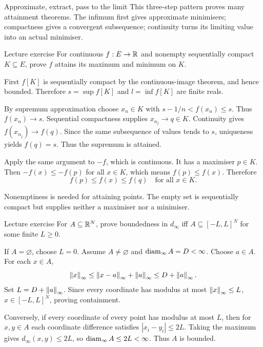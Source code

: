 \begin{method}{Approximate, extract, pass to the limit}
This three-step pattern proves many attainment theorems. The infimum first gives approximate minimisers; compactness gives a convergent subsequence; continuity turns its limiting value into an actual minimiser.
\end{method}
\begin{exam}{Lecture exercise}
For continuous $f:E\to\mathbb R$ and nonempty sequentially compact $K\subseteq E$, prove $f$ attains its maximum and minimum on $K$.
\end{exam}
\begin{answer}
First $f[K]$ is sequentially compact by the continuous-image theorem, and hence bounded. Therefore $s=\sup f[K]$ and $l=\inf f[K]$ are finite reals.

By supremum approximation choose $x_n\in K$ with $s-1/n<f(x_n)\le s$. Thus $f(x_n)\to s$. Sequential compactness supplies $x_{n_j}\to q\in K$. Continuity gives $f(x_{n_j})\to f(q)$. Since the same subsequence of values tends to $s$, uniqueness yields $f(q)=s$. Thus the supremum is attained.

Apply the same argument to $-f$, which is continuous. It has a maximiser $p\in K$. Then $-f(x)\le-f(p)$ for all $x\in K$, which means $f(p)\le f(x)$. Therefore
\[f(p)\le f(x)\le f(q)\quad\text{for all }x\in K.\]
\end{answer}
\begin{tip}
Nonemptiness is needed for attaining points. The empty set is sequentially compact but supplies neither a maximiser nor a minimiser.
\end{tip}
\begin{exam}{Lecture exercise}
For $A\subseteq\mathbb R^N$, prove boundedness in $d_\infty$ iff $A\subseteq[-L,L]^N$ for some finite $L\ge0$.
\end{exam}
\begin{answer}
If $A=\varnothing$, choose $L=0$. Assume $A\ne\varnothing$ and $\operatorname{diam}_\infty A=D<\infty$. Choose $a\in A$. For each $x\in A$,
\[\left\lVert x\right\rVert_\infty\le\left\lVert x-a\right\rVert_\infty+\left\lVert a\right\rVert_\infty\le D+\left\lVert a\right\rVert_\infty.\]
Set $L=D+\left\lVert a\right\rVert_\infty$. Since every coordinate has modulus at most $\left\lVert x\right\rVert_\infty\le L$, $x\in[-L,L]^N$, proving containment.

Conversely, if every coordinate of every point has modulus at most $L$, then for $x,y\in A$ each coordinate difference satisfies $|x_i-y_i|\le2L$. Taking the maximum gives $d_\infty(x,y)\le2L$, so $\operatorname{diam}_\infty A\le2L<\infty$. Thus $A$ is bounded.
\end{answer}

